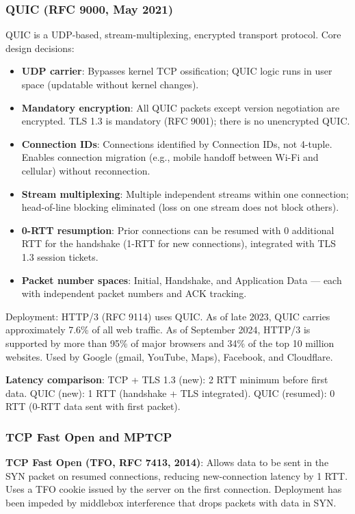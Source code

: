 \documentclass[11pt,letterpaper]{article}
\begin{document}
\subsubsection{QUIC (RFC 9000, May 2021)}

QUIC is a UDP-based, stream-multiplexing, encrypted transport protocol. Core design decisions:

\begin{itemize}[noitemsep]
  \item \textbf{UDP carrier}: Bypasses kernel TCP ossification; QUIC logic runs in user space (updatable without kernel changes).
  \item \textbf{Mandatory encryption}: All QUIC packets except version negotiation are encrypted. TLS 1.3 is mandatory (RFC 9001); there is no unencrypted QUIC.
  \item \textbf{Connection IDs}: Connections identified by Connection IDs, not 4-tuple. Enables connection migration (e.g., mobile handoff between Wi-Fi and cellular) without reconnection.
  \item \textbf{Stream multiplexing}: Multiple independent streams within one connection; head-of-line blocking eliminated (loss on one stream does not block others).
  \item \textbf{0-RTT resumption}: Prior connections can be resumed with 0 additional RTT for the handshake (1-RTT for new connections), integrated with TLS 1.3 session tickets.
  \item \textbf{Packet number spaces}: Initial, Handshake, and Application Data --- each with independent packet numbers and ACK tracking.
\end{itemize}

Deployment: HTTP/3 (RFC 9114) uses QUIC. As of late 2023, QUIC carries approximately 7.6\% of all web traffic. As of September 2024, HTTP/3 is supported by more than 95\% of major browsers and 34\% of the top 10 million websites. Used by Google (gmail, YouTube, Maps), Facebook, and Cloudflare.

\textbf{Latency comparison}:
TCP + TLS 1.3 (new): 2 RTT minimum before first data.
QUIC (new): 1 RTT (handshake + TLS integrated).
QUIC (resumed): 0 RTT (0-RTT data sent with first packet).

\subsubsection{TCP Fast Open and MPTCP}

\textbf{TCP Fast Open (TFO, RFC 7413, 2014)}: Allows data to be sent in the SYN packet on resumed connections, reducing new-connection latency by 1 RTT. Uses a TFO cookie issued by the server on the first connection. Deployment has been impeded by middlebox interference that drops packets with data in SYN.
\end{document}
